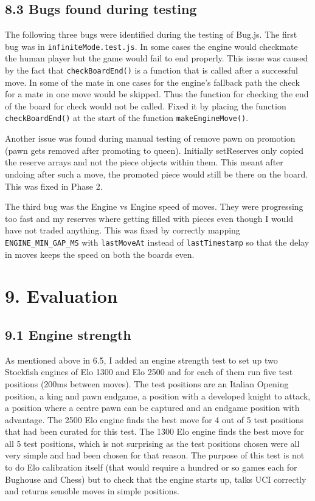 \documentclass[11pt,a4paper]{article}
\begin{document}
\subsection*{8.3 Bugs found during testing}

The following three bugs were identified during the testing of Bug.js. The first bug was in \texttt{infiniteMode.test.js}. In some cases the engine would checkmate the human player but the game would fail to end properly. This issue was caused by the fact that \texttt{checkBoardEnd()} is a function that is called after a successful move. In some of the mate in one cases for the engine’s fallback path the check for a mate in one move would be skipped. Thus the function for checking the end of the board for check would not be called. Fixed it by placing the function \texttt{checkBoardEnd()} at the start of the function \texttt{makeEngineMove()}.

Another issue was found during manual testing of  remove pawn on promotion (pawn gets removed after promoting to queen). Initially setReserves only copied the reserve arrays and not the piece objects within them. This meant after undoing after such a move, the promoted piece would still be there on the board. This was fixed in Phase 2.

The third bug was the Engine vs Engine speed of moves. They were progressing too fast and my reserves where getting filled with pieces even though I would have not traded anything. This was fixed by correctly mapping \texttt{ENGINE\_MIN\_GAP\_MS} with \texttt{lastMoveAt} instead of \texttt{lastTimestamp} so that the delay in moves keeps the speed on both the boards even.

\newpage
\section*{9. Evaluation}
\subsection*{9.1 Engine strength}
As mentioned above in 6.5, I added an engine strength test to set up two Stockfish engines of Elo 1300 and Elo 2500 and for each of them run five test positions (200ms between moves). The test positions are an Italian Opening position, a king and pawn endgame, a position with a developed knight to attack, a position where a centre pawn can be captured and an endgame position with advantage. The 2500 Elo engine finds the best move for 4 out of 5 test positions that had been curated for this test. The 1300 Elo engine finds the best move for all 5 test positions, which is not surprising as the test positions chosen were all very simple and had been chosen for that reason. The purpose of this test is not to do Elo calibration itself (that would require a hundred or so games each for Bughouse and Chess) but to check that the engine starts up, talks UCI correctly and returns sensible moves in simple positions.
\end{document}
